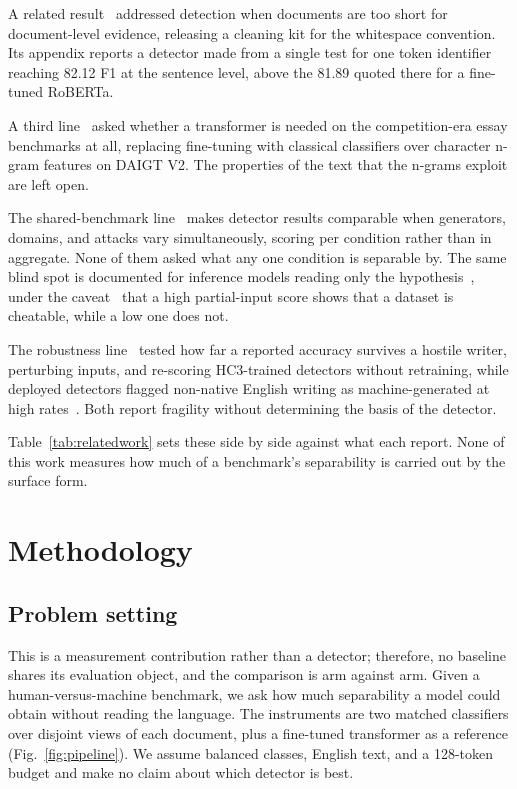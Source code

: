 \documentclass[conference,a4paper]{IEEEtran}
\newcommand{\tabref}[1]{\hyperref[#1]{\ref*{#1}}}
\newcommand{\figref}[1]{\hyperref[#1]{\ref*{#1}}}
\begin{document}
A related result~\cite{Tian2023multiscale} addressed detection when documents are too short for document-level evidence, releasing a cleaning kit for the whitespace convention. Its appendix reports a detector made from a single test for one token identifier reaching 82.12 F1 at the sentence level, above the 81.89 quoted there for a fine-tuned RoBERTa.

A third line~\cite{Zhou2024exploiting} asked whether a transformer is needed on the competition-era essay benchmarks at all, replacing fine-tuning with classical classifiers over character n-gram features on DAIGT V2. The properties of the text that the n-grams exploit are left open.

The shared-benchmark line~\cite{Dugan2024raid,Wang2024m4} makes detector results comparable when generators, domains, and attacks vary simultaneously, scoring per condition rather than in aggregate. None of them asked what any one condition is separable by. The same blind spot is documented for inference models reading only the hypothesis~\cite{Gururangan2018annotation,Poliak2018hypothesis,Geirhos2020shortcut}, under the caveat~\cite{Feng2019misleading} that a high partial-input score shows that a dataset is cheatable, while a low one does not.

The robustness line~\cite{Antoun2023towards} tested how far a reported accuracy survives a hostile writer, perturbing inputs, and re-scoring HC3-trained detectors without retraining, while deployed detectors flagged non-native English writing as machine-generated at high rates~\cite{Liang2023gpt}. Both report fragility without determining the basis of the detector.

Table~\tabref{tab:relatedwork} sets these side by side against what each report. None of this work measures how much of a benchmark's separability is carried out by the surface form.

\section{Methodology}
\label{sec:method}

\subsection{Problem setting}
\label{sec:problem}

This is a measurement contribution rather than a detector; therefore, no baseline shares its evaluation object, and the comparison is arm against arm. Given a human-versus-machine benchmark, we ask how much separability a model could obtain without reading the language. The instruments are two matched classifiers over disjoint views of each document, plus a fine-tuned transformer as a reference (Fig.~\figref{fig:pipeline}). We assume balanced classes, English text, and a 128-token budget and make no claim about which detector is best.
\end{document}
